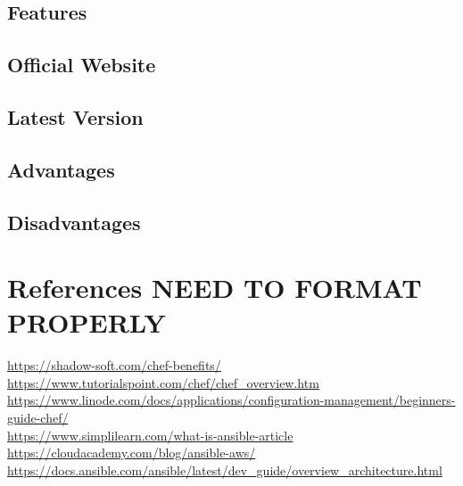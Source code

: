 \documentclass[a4paper, 12pt]{article}
\begin{document}
\subsection{Features}
\subsection{Official Website}
\subsection{Latest Version}
\subsection{Advantages}
\subsection{Disadvantages}

\newpage
\section{References NEED TO FORMAT PROPERLY}
\href{https://shadow-soft.com/chef-benefits/}{https://shadow-soft.com/chef-benefits/}\\
\href{https://www.tutorialspoint.com/chef/chef_overview.htm}{https://www.tutorialspoint.com/chef/chef\_overview.htm}\\
\href{https://www.linode.com/docs/applications/configuration-management/beginners-guide-chef/}{https://www.linode.com/docs/applications/configuration-management/beginners-guide-chef/}\\
\href{https://www.simplilearn.com/what-is-ansible-article}{https://www.simplilearn.com/what-is-ansible-article}\\
\href{https://cloudacademy.com/blog/ansible-aws/}{https://cloudacademy.com/blog/ansible-aws/}\\
\href{https://docs.ansible.com/ansible/latest/dev_guide/overview_architecture.html}{https://docs.ansible.com/ansible/latest/dev\_guide/overview\_architecture.html}\\
\end{document}
